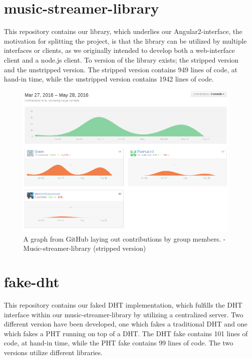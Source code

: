 \section{music-streamer-library}
\label{sec:appendix-music-streamer-library}
This repository contains our library, which underlies our Angular2-interface,
the motivation for splitting the project, is that the library can be utilized 
by multiple interfaces or clients, as we originally intended to develop both a
web-interface client and a node.js client.
\newline\newline
To version of the library exists; the stripped version and the unstripped
version. The stripped version contains 949 lines of code, at hand-in time, while
the unstripped version contains 1942 lines of code.

\begin{figure}[H]
  \centering
    \includegraphics[width=\linewidth]{gfx/Music-streamer-library}
    \caption{A graph from GitHub laying out contributions by group members. - Music-streamer-library (stripped version)}
  \label{fig:music-stramer-library}
\end{figure}

\section{fake-dht}
This repository contains our faked \acs{DHT} implementation, which fulfills the \acs{DHT}
interface within our music-streamer-library by utilizing a centralized server.
\newline
Two different version have been developed, one which fakes a traditional \acs{DHT}
and one which fakes a \acs{PHT} running on top of a \acs{DHT}.
\newline\newline
The \acs{DHT} fake contains 101 lines of code, at hand-in time, while the \acs{PHT} fake 
contains 99 lines of code. The two versions utilize different libraries.

